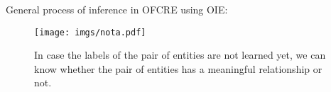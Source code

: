\begin{table}[ht]
    \caption{Hyperparameter configuration for OFCRE}
    \label{tab:hyperparameters_cpl1}
\end{table}
General process of inference in OFCRE using OIE:
\begin{figure}[ht]
    \centering
    \texttt{[image: imgs/nota.pdf]}
    \caption{In case the labels of the pair of entities are not learned yet, we can know whether the pair of entities has a meaningful relationship or not.}
    \label{fig:infer}
\end{figure}
